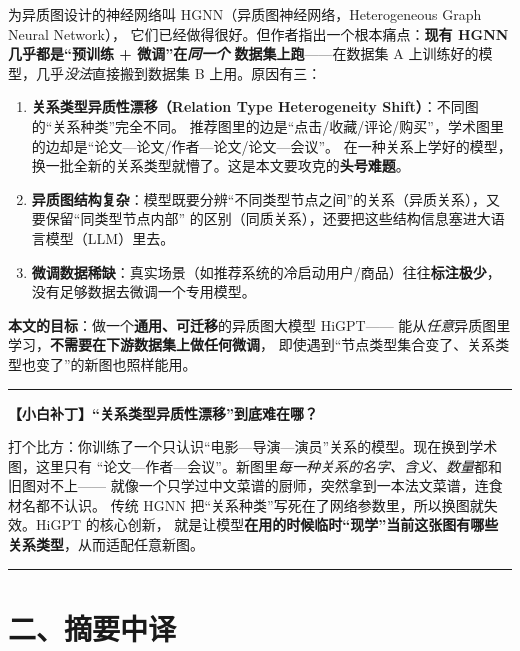 \documentclass[11pt,UTF8,fontset=fandol]{ctexart}
\newenvironment{tip}[1]{%
  \par\smallskip\noindent\rule{\linewidth}{0.4pt}\par\nobreak
  \noindent\textbf{【小白补丁】#1}\par\nobreak\noindent\ignorespaces
}{%
  \par\noindent\rule{\linewidth}{0.4pt}\par\smallskip
}
\begin{document}
为异质图设计的神经网络叫 HGNN（异质图神经网络，Heterogeneous Graph Neural Network），
它们已经做得很好。但作者指出一个根本痛点：\textbf{现有 HGNN 几乎都是“预训练 + 微调”在\emph{同一个}
数据集上跑}——在数据集 A 上训练好的模型，几乎\emph{没法}直接搬到数据集 B 上用。原因有三：

\begin{enumerate}[leftmargin=2em]
  \item \textbf{关系类型异质性漂移（Relation Type Heterogeneity Shift）}：不同图的“关系种类”完全不同。
        推荐图里的边是“点击/收藏/评论/购买”，学术图里的边却是“论文—论文/作者—论文/论文—会议”。
        在一种关系上学好的模型，换一批全新的关系类型就懵了。这是本文要攻克的\textbf{头号难题}。
  \item \textbf{异质图结构复杂}：模型既要分辨“不同类型节点之间”的关系（异质关系），又要保留“同类型节点内部”
        的区别（同质关系），还要把这些结构信息塞进大语言模型（LLM）里去。
  \item \textbf{微调数据稀缺}：真实场景（如推荐系统的冷启动用户/商品）往往\textbf{标注极少}，
        没有足够数据去微调一个专用模型。
\end{enumerate}

\textbf{本文的目标}：做一个\textbf{通用、可迁移}的异质图大模型 HiGPT——
能从\emph{任意}异质图里学习，\textbf{不需要在下游数据集上做任何微调}，
即使遇到“节点类型集合变了、关系类型也变了”的新图也照样能用。

\begin{tip}{“关系类型异质性漂移”到底难在哪？}
打个比方：你训练了一个只认识“电影—导演—演员”关系的模型。现在换到学术图，这里只有
“论文—作者—会议”。新图里\emph{每一种关系的名字、含义、数量}都和旧图对不上——
就像一个只学过中文菜谱的厨师，突然拿到一本法文菜谱，连食材名都不认识。
传统 HGNN 把“关系种类”写死在了网络参数里，所以换图就失效。HiGPT 的核心创新，
就是让模型\textbf{在用的时候临时“现学”当前这张图有哪些关系类型}，从而适配任意新图。
\end{tip}

\section{二、摘要中译}
\end{document}
